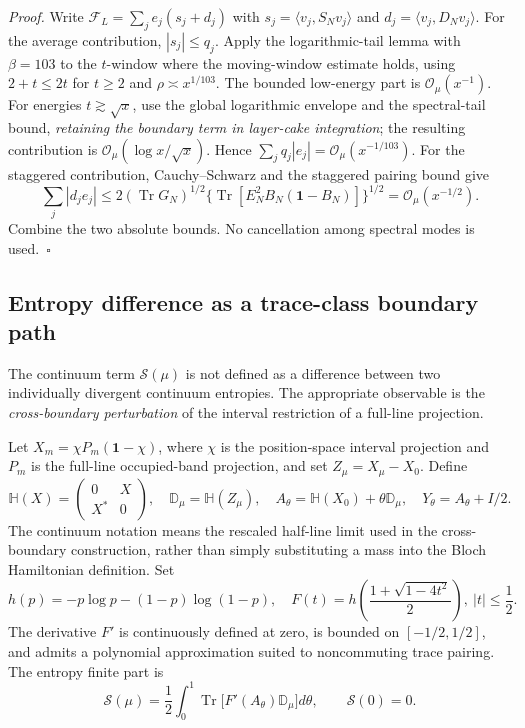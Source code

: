 \documentclass[
  10pt,
  a4paper,
]{article}
\begin{document}
\emph{Proof.} Write \(\mathcal F_L=\sum_j e_j(s_j+d_j)\) with \(s_j=\langle v_j,S_Nv_j\rangle\) and \(d_j=\langle v_j,D_Nv_j\rangle\). For the average contribution, \(|s_j|\le q_j\). Apply the logarithmic-tail lemma with \(\beta=103\) to the \(t\)-window where the moving-window estimate holds, using \(2+t\le2t\) for \(t\ge2\) and \(\rho\asymp x^{1/103}\). The bounded low-energy part is \(\mathcal O_\mu(x^{-1})\). For energies \(t\gtrsim\sqrt x\), use the global logarithmic envelope and the spectral-tail bound, \emph{retaining the boundary term in layer-cake integration}; the resulting contribution is \(\mathcal O_\mu(\log x/\sqrt x)\). Hence \(\sum_jq_j|e_j|=\mathcal O_\mu(x^{-1/103})\). For the staggered contribution, Cauchy--Schwarz and the staggered pairing bound give \[\sum_j|d_je_j|\le2(\operatorname{Tr}G_N)^{1/2}\{\operatorname{Tr}[E_N^2B_N(\mathbf 1-B_N)]\}^{1/2}
=\mathcal O_\mu(x^{-1/2}).\] Combine the two absolute bounds. No cancellation among spectral modes is used.~\(\square\)

\subsection{Entropy difference as a trace-class boundary path}\label{entropy-difference-as-a-trace-class-boundary-path}

The continuum term \(\mathcal S(\mu)\) is not defined as a difference between two individually divergent continuum entropies. The appropriate observable is the \emph{cross-boundary perturbation} of the interval restriction of a full-line projection.

Let \(X_m=\chi P_m(\mathbf 1-\chi)\), where \(\chi\) is the position-space interval projection and \(P_m\) is the full-line occupied-band projection, and set \(Z_\mu=X_\mu-X_0\). Define \[\mathbb H(X)=\begin{pmatrix}0&X\\X^*&0\end{pmatrix},\quad
\mathbb D_\mu=\mathbb H(Z_\mu),\quad A_\theta=\mathbb H(X_0)+\theta\mathbb D_\mu,\quad Y_\theta=A_\theta+I/2.\] The continuum notation means the rescaled half-line limit used in the cross-boundary construction, rather than simply substituting a mass into the Bloch Hamiltonian definition. Set \[h(p)=-p\log p-(1-p)\log(1-p),\quad
F(t)=h\left(\frac{1+\sqrt{1-4t^2}}2\right),\ |t|\le\frac12.\] The derivative \(F'\) is continuously defined at zero, is bounded on \([-1/2,1/2]\), and admits a polynomial approximation suited to noncommuting trace pairing. The entropy finite part is \begin{equation}
\label{eq:Sdefinition}
\mathcal S(\mu)=\frac12\int_0^1\operatorname{Tr}\bigl[F'(A_\theta)\mathbb D_\mu\bigr]d\theta,\qquad \mathcal S(0)=0.
\end{equation}
\end{document}

